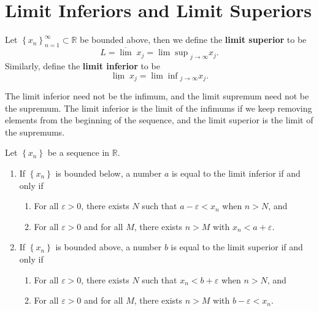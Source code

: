 \documentclass[10pt]{report}
\begin{document}

\section{Limit Inferiors and Limit Superiors}
\begin{defn}[]
Let $\left\{ x_n \right\}_{n=1}^\infty \subset \mathbb{R}$ be bounded above, then we define the \textbf{limit superior} to be
\[
	L = \overline{\lim} \;x_j = {\lim\sup}_{j\to\infty}x_j.
\] Similarly, define the \textbf{limit inferior} to be
\[
	\underline{\lim} \;x_j = {\lim\inf}_{j\to\infty} x_j.
\] 
\end{defn}

The limit inferior need not be the infimum, and the limit supremum need not be the supremum. The limit inferior is the limit of the infimums if we keep removing elements from the beginning of the sequence, and the limit superior is the limit of the supremums.

\begin{prop}
	Let $\left\{ x_n \right\}$ be a sequence in $\mathbb{R}$.
	\begin{enumerate}
		\item If $\left\{ x_n \right\}$ is bounded below, a number $a$ is equal to the limit inferior if and only if
			\begin{enumerate}
				\item For all $\varepsilon>0$, there exists $N$ such that $a-\varepsilon<x_n$ when $n>N$, and
				\item For all $\varepsilon>0$ and for all $M$, there exists $n > M$ with $x_n < a + \varepsilon$.
			\end{enumerate}

		\item If $\left\{ x_n \right\}$ is bounded above, a number $b$ is equal to the limit superior if and only if
			\begin{enumerate}
				\item For all $\varepsilon>0$, there exists $N$ such that $x_n < b + \varepsilon$ when $n >N$, and
				\item For all $\varepsilon>0$ and for all $M$, there exists $n > M$ with $b-\varepsilon< x_n$.
			\end{enumerate}
	\end{enumerate}
\end{prop}

\pagebreak

\end{document}
